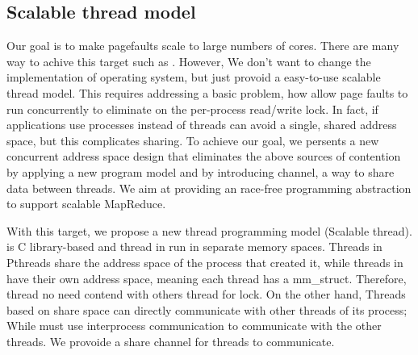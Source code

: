 



\subsection{Scalable thread model}

Our goal is to make pagefaults scale to 
large numbers of cores.
There are many way to achive this target such as \cite{Clements2012Scalable}.
However, We don't want to change the implementation of operating system, 
but just provoid a easy-to-use scalable thread model.
This requires addressing a basic problem,
how allow page faults to run concurrently 
to eliminate on the per-process read/write lock.
In fact, if applications use processes instead of threads can avoid a single, 
shared address space, but this complicates sharing.
To achieve our goal, we persents a new concurrent address space design 
that eliminates the above sources of contention by applying a new program model and by introducing channel, a way to share data between threads.
We aim at providing an race-free programming abstraction 
to support scalable MapReduce.


With this target, we propose a new thread programming model \myth(Scalable thread).
\myth is C library-based and 
thread in \myth run in separate memory spaces.
Threads in Pthreads share the address space of the process that created it, 
while threads in \myth have their own address space,
meaning each thread has a mm\_struct.
Therefore, thread no need contend with others thread for lock.
On the other hand,
Threads based on share space can directly communicate with other threads of its process; 
While \myth must use interprocess communication to communicate with the other threads.
We provoide a share channel for threads to communicate.


